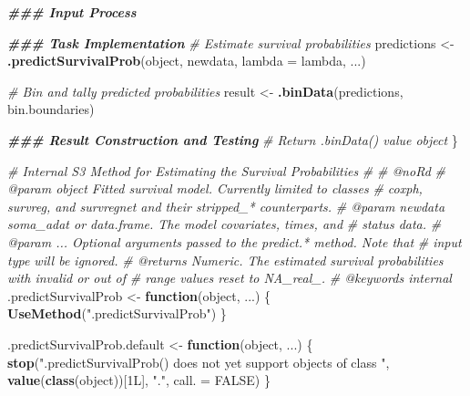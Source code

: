 \documentclass[
]{book}
\newenvironment{Shaded}{\begin{snugshade}}{\end{snugshade}}
\newcommand{\AttributeTok}[1]{\textcolor[rgb]{0.13,0.29,0.53}{#1}}
\newcommand{\CommentTok}[1]{\textcolor[rgb]{0.56,0.35,0.01}{\textit{#1}}}
\newcommand{\ConstantTok}[1]{\textcolor[rgb]{0.56,0.35,0.01}{#1}}
\newcommand{\ControlFlowTok}[1]{\textcolor[rgb]{0.13,0.29,0.53}{\textbf{#1}}}
\newcommand{\DocumentationTok}[1]{\textcolor[rgb]{0.56,0.35,0.01}{\textbf{\textit{#1}}}}
\newcommand{\FunctionTok}[1]{\textcolor[rgb]{0.13,0.29,0.53}{\textbf{#1}}}
\newcommand{\NormalTok}[1]{#1}
\newcommand{\OtherTok}[1]{\textcolor[rgb]{0.56,0.35,0.01}{#1}}
\newcommand{\StringTok}[1]{\textcolor[rgb]{0.31,0.60,0.02}{#1}}
\begin{document}
\begin{Shaded}
\begin{Highlighting}[]
  \DocumentationTok{\#\#\# Input Process}
  
  \DocumentationTok{\#\#\# Task Implementation}
  \CommentTok{\# Estimate survival probabilities}
\NormalTok{  predictions }\OtherTok{\textless{}{-}} \FunctionTok{.predictSurvivalProb}\NormalTok{(object, newdata, }\AttributeTok{lambda =}\NormalTok{ lambda, ...)}
  
  \CommentTok{\# Bin and tally predicted probabilities}
\NormalTok{  result }\OtherTok{\textless{}{-}} \FunctionTok{.binData}\NormalTok{(predictions, bin.boundaries)}
  
  \DocumentationTok{\#\#\# Result Construction and Testing}
  \CommentTok{\# Return \textasciigrave{}.binData()\textasciigrave{} value object}
\NormalTok{\}}

\CommentTok{\#\textquotesingle{} Internal S3 Method for Estimating the Survival Probabilities}
\CommentTok{\#\textquotesingle{} }
\CommentTok{\#\textquotesingle{} @noRd}
\CommentTok{\#\textquotesingle{} @param object Fitted survival model. Currently limited to classes}
\CommentTok{\#\textquotesingle{}   \textasciigrave{}coxph\textasciigrave{}, \textasciigrave{}survreg\textasciigrave{}, and \textasciigrave{}survregnet\textasciigrave{} and their \textasciigrave{}stripped\_*\textasciigrave{} counterparts.}
\CommentTok{\#\textquotesingle{} @param newdata soma\_adat or data.frame. The model covariates, times, and}
\CommentTok{\#\textquotesingle{}   status data.}
\CommentTok{\#\textquotesingle{} @param ... Optional arguments passed to the \textasciigrave{}predict.*\textasciigrave{} method. Note that}
\CommentTok{\#\textquotesingle{}   input \textasciigrave{}type\textasciigrave{} will be ignored.}
\CommentTok{\#\textquotesingle{} @returns Numeric. The estimated survival probabilities with invalid or out of}
\CommentTok{\#\textquotesingle{}   range values reset to NA\_real\_.}
\CommentTok{\#\textquotesingle{} @keywords internal}
\NormalTok{.predictSurvivalProb }\OtherTok{\textless{}{-}} \ControlFlowTok{function}\NormalTok{(object, ...) \{ }
  \FunctionTok{UseMethod}\NormalTok{(}\StringTok{".predictSurvivalProb"}\NormalTok{) }
\NormalTok{\}}

\NormalTok{.predictSurvivalProb.default }\OtherTok{\textless{}{-}} \ControlFlowTok{function}\NormalTok{(object, ...) \{}
  \FunctionTok{stop}\NormalTok{(}\StringTok{"\textasciigrave{}.predictSurvivalProb()\textasciigrave{} does not yet support objects of class "}\NormalTok{,}
       \FunctionTok{value}\NormalTok{(}\FunctionTok{class}\NormalTok{(object))[1L], }\StringTok{"."}\NormalTok{, }\AttributeTok{call. =} \ConstantTok{FALSE}\NormalTok{)}
\NormalTok{\}}


\end{Highlighting}
\end{Shaded}
\end{document}
